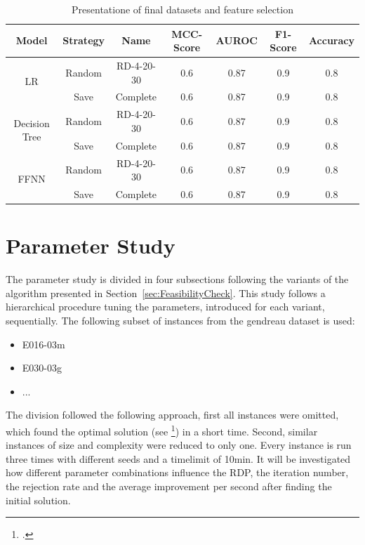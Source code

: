 \begin{table}[ht]
    \centering
    \begin{tabular}{c c c c c c c}
        \toprule
        Model                          & Strategy & Name       & \gls{MCC}-Score & \gls{AUROC} & F1-Score & Accuracy \\
        \midrule
        \multirow{2}{*}{\gls{LR}}      & Random   & RD-4-20-30 & 0.6             & 0.87        & 0.9      & 0.8      \\
                                       & Save     & Complete   & 0.6             & 0.87        & 0.9      & 0.8      \\
        \midrule
        \multirow{2}{*}{Decision Tree} & Random   & RD-4-20-30 & 0.6             & 0.87        & 0.9      & 0.8      \\
                                       & Save     & Complete   & 0.6             & 0.87        & 0.9      & 0.8      \\
        \midrule
        \multirow{2}{*}{\gls{FFNN}}    & Random   & RD-4-20-30 & 0.6             & 0.87        & 0.9      & 0.8      \\
                                       & Save     & Complete   & 0.6             & 0.87        & 0.9      & 0.8      \\

        \bottomrule
    \end{tabular}
    \caption{Presentatione of final datasets and feature selection}
    \label{tab:final_dataset_features}
\end{table}

\section{Parameter Study}
\label{sec:parameter_study}

The parameter study is divided in four subsections following the variants of the algorithm
presented in Section~\ref{sec:FeasibilityCheck}. This study follows a hierarchical procedure
tuning the parameters, introduced for each variant, sequentially. The following subset of instances
from the gendreau dataset is used:

\begin{itemize}
    \item E016-03m
    \item E030-03g
    \item ...
\end{itemize}

The division followed the following approach, first all instances were omitted, which found
the optimal solution (see \cite{tamke_branch-and-cut_2024}\footcite[cf.][p.26]{tamke_branch-and-cut_2024})
in a short time. Second, similar instances of size and complexity were reduced to only one.
Every instance is run three times with different seeds and a timelimit of 10min. It will be investigated
how different parameter combinations influence the RDP, the iteration number, the rejection rate and
the average improvement per second after finding the initial solution.


